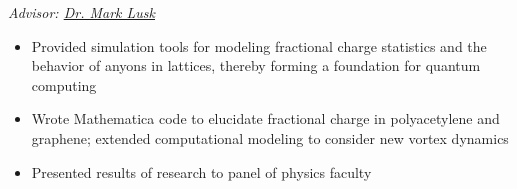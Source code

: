 \documentclass{article}
\begin{document}
\hspace{1.5em} \textit{Advisor: \href{https://people.mines.edu/mlusk/}{Dr. Mark Lusk}}

\vspace{-0.5em}

\begin{itemize}[leftmargin=6.0em]
\setlength{\itemsep}{0em}
\item Provided simulation tools for modeling fractional charge statistics and the behavior of anyons in lattices, thereby forming a foundation for quantum computing
\item Wrote Mathematica code to elucidate fractional charge in polyacetylene and graphene; extended computational modeling to consider new vortex dynamics
\item Presented results of research to panel of physics faculty
\end{itemize}
\end{document}
